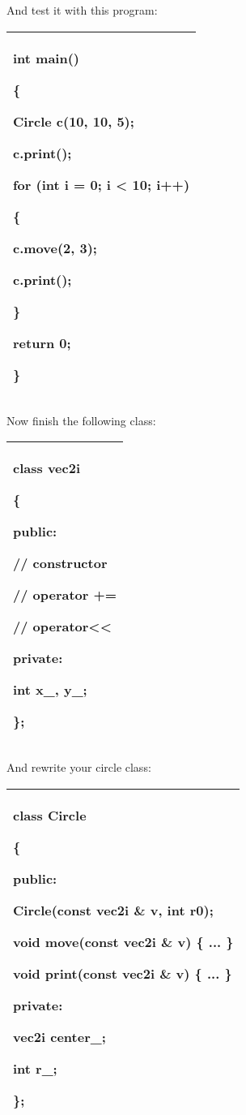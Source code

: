 \documentclass[
]{article}
\begin{document}
And test it with this program:

\begin{longtable}[]{@{}l@{}}
\toprule
\endhead
\begin{minipage}[t]{0.97\columnwidth}\raggedright
int main()

\{

Circle c(10, 10, 5);

c.print();

for (int i = 0; i \textless{} 10; i++)

\{

c.move(2, 3);

c.print();

\}

return 0;

\}\strut
\end{minipage}\tabularnewline
\bottomrule
\end{longtable}

Now finish the following class:

\begin{longtable}[]{@{}l@{}}
\toprule
\endhead
\begin{minipage}[t]{0.97\columnwidth}\raggedright
class vec2i

\{

public:

// constructor

// operator +=

// operator\textless\textless{}

private:

int x\_, y\_;

\};\strut
\end{minipage}\tabularnewline
\bottomrule
\end{longtable}

And rewrite your circle class:

\begin{longtable}[]{@{}l@{}}
\toprule
\endhead
\begin{minipage}[t]{0.97\columnwidth}\raggedright
class Circle

\{

public:

Circle(\textbf{const vec2i \& v}, int r0);

void move(\textbf{const vec2i \& v}) \{ ... \}

void print(\textbf{const vec2i \& v}) \{ ... \}

private:

\textbf{vec2i center\_;}

int r\_;

\};\strut
\end{minipage}\tabularnewline
\bottomrule
\end{longtable}
\end{document}
